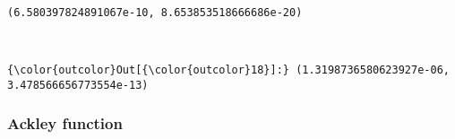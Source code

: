 \documentclass[11pt]{article}
\begin{document}
    \begin{center}
    \end{center}
    { \hspace*{\fill} \\}
    
    \begin{Verbatim}[commandchars=\\\{\}]
(6.580397824891067e-10, 8.653853518666686e-20)

    \end{Verbatim}

    \begin{center}
    \end{center}
    { \hspace*{\fill} \\}
    
\begin{Verbatim}[commandchars=\\\{\}]
{\color{outcolor}Out[{\color{outcolor}18}]:} (1.3198736580623927e-06, 3.478566656773554e-13)
\end{Verbatim}
            
    \subsubsection{Ackley function}\label{ackley-function}
\end{document}
